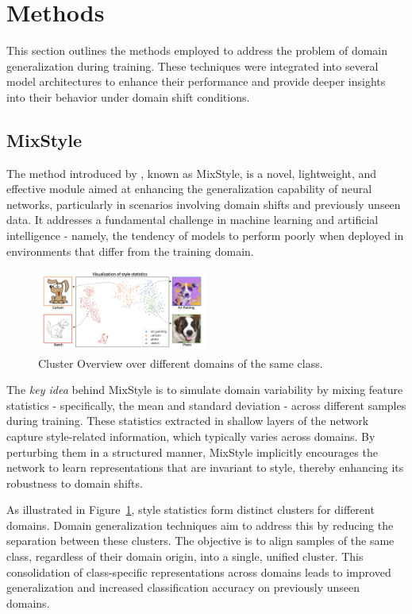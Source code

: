 \section{Methods}
This section outlines the methods employed to address the problem of domain generalization during training. These techniques were integrated into several model architectures to enhance their performance and provide deeper insights into their behavior under domain shift conditions.
\subsection{MixStyle}
The method introduced by \cite{zhouMixStyleNeuralNetworks2023}, known as MixStyle, is a novel, lightweight, and effective module aimed at enhancing the generalization capability of neural networks, particularly in scenarios involving domain shifts and previously unseen data. It addresses a fundamental challenge in machine learning and artificial intelligence - namely, the tendency of models to perform poorly when deployed in environments that differ from the training domain.

\vspace{0.5cm}

\begin{figure}[h]
	\centering
	\includegraphics[width=0.5\textwidth]{images/mixstyle_domain.png}
	\caption{Cluster Overview over different domains of the same class.}
	\label{fig:mixstyle}
\end{figure}

\vspace{0.5cm}

The \textit{key idea} behind MixStyle is to simulate domain variability by mixing feature statistics - specifically, the mean and standard deviation - across different samples during training. These statistics extracted in shallow layers of the network capture style-related information, which typically varies across domains. By perturbing them in a structured manner, MixStyle implicitly encourages the network to learn representations that are invariant to style, thereby enhancing its robustness to domain shifts.

As illustrated in Figure~\ref{fig:mixstyle}, style statistics form distinct clusters for different domains. Domain generalization techniques aim to address this by reducing the separation between these clusters. The objective is to align samples of the same class, regardless of their domain origin, into a single, unified cluster. This consolidation of class-specific representations across domains leads to improved generalization and increased classification accuracy on previously unseen domains.

